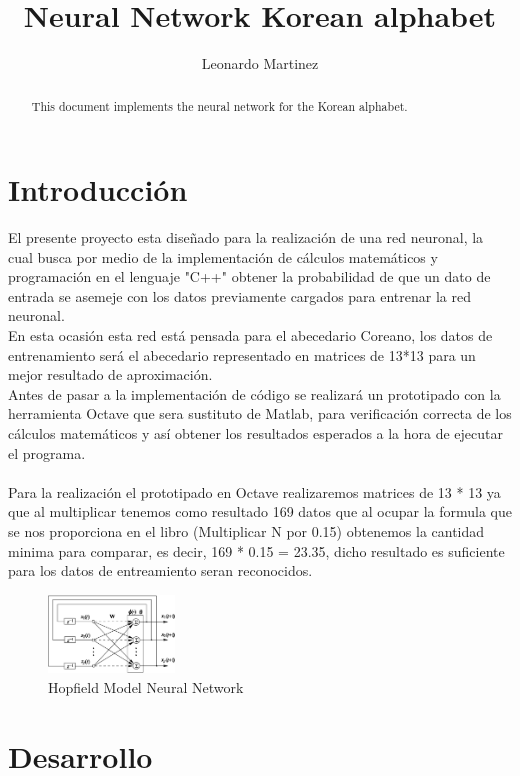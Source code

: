 \documentclass[10pt]{article}         %
\title{Neural Network Korean alphabet}
\author{Leonardo Martinez}
\begin{document}
\maketitle

\begin{abstract}
This document implements the neural network for the Korean alphabet.
\end{abstract}

\section{Introducción}
El presente proyecto esta diseñado para la realización de una red neuronal, la cual busca por medio de la implementación de cálculos matemáticos y \\programación en el lenguaje "C++" obtener la probabilidad de que un dato de entrada se asemeje con los datos previamente cargados para entrenar la red neuronal.\\
En esta ocasión esta red está pensada para el abecedario Coreano, los datos de entrenamiento será el abecedario representado en matrices de 13*13 para un mejor resultado de aproximación.\\
Antes de pasar a la implementación de código se realizará un prototipado con la herramienta Octave que sera sustituto de Matlab, para verificación correcta de los cálculos matemáticos y así obtener los resultados esperados a la hora de ejecutar el programa.\\
\\
Para la realización el prototipado en Octave realizaremos matrices de 13 * 13 ya que al multiplicar tenemos como resultado 169 datos que al ocupar la formula que se nos proporciona en el libro (Multiplicar N por 0.15) obtenemos la cantidad minima para comparar, es decir, 169 * 0.15 = 23.35, dicho resultado es suficiente para los datos de entreamiento seran reconocidos.   	

\begin{figure}[htb]
\centering
\includegraphics[width=0.3\textwidth]{hopfield.png}
\caption{Hopfield Model Neural Network}
\label{fig:tigre}
\end{figure}

\section{Desarrollo}
\end{document}

